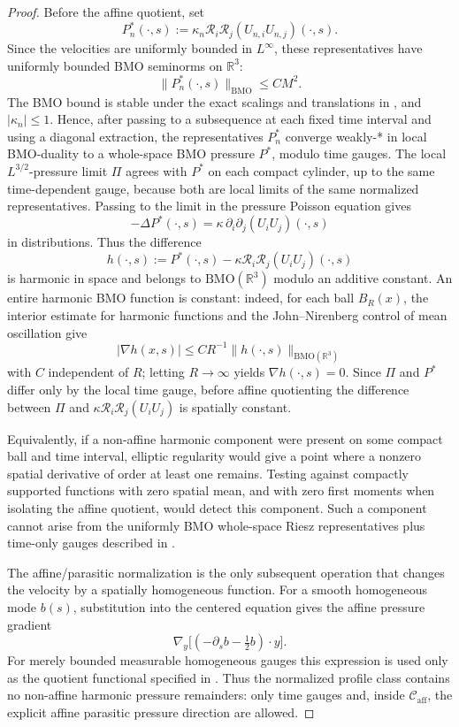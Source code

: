 \documentclass[11pt]{amsart}
\numberwithin{equation}{section}
\theoremstyle{plain}
\theoremstyle{definition}
\theoremstyle{remark}
\newcommand{\Caff}{\mathcal C_{\mathrm{aff}}}
\begin{document}
\begin{proof}
Before the affine quotient, set
\[
   P_n^\ast(\cdot,s):=\kappa_n\mathcal R_i\mathcal R_j(U_{n,i}U_{n,j})(\cdot,s).
\]
Since the velocities are uniformly bounded in \(L^\infty\), these
representatives have uniformly bounded BMO seminorms on \(\mathbb R^3\):
\[
   \|P_n^\ast(\cdot,s)\|_{\mathrm{BMO}}
   \le C M^2 .
\]
The BMO bound is stable under the exact scalings and translations in
, and \(|\kappa_n|\le1\).  Hence,
after passing to a subsequence at each fixed time interval and using a diagonal
extraction, the representatives \(P_n^\ast\) converge weakly-* in local
BMO-duality to a whole-space BMO pressure \(P^\ast\), modulo time gauges.  The
local \(L^{3/2}\)-pressure limit \(\Pi\) agrees with \(P^\ast\) on each compact
cylinder, up to the same time-dependent gauge, because both are local limits of
the same normalized representatives.  Passing to the limit in the pressure
Poisson equation gives
\[
   -\Delta P^\ast(\cdot,s)
   =
   \kappa\,\partial_i\partial_j(U_iU_j)(\cdot,s)
\]
in distributions.  Thus the difference
\[
   h(\cdot,s):=P^\ast(\cdot,s)-\kappa\mathcal R_i\mathcal R_j(U_iU_j)(\cdot,s)
\]
is harmonic in space and belongs to \(\mathrm{BMO}(\mathbb R^3)\) modulo an
additive constant.  An entire harmonic BMO function is constant: indeed, for
each ball \(B_R(x)\), the interior estimate for harmonic functions and the
John--Nirenberg control of mean oscillation give
\[
   |\nabla h(x,s)|
   \le
   C R^{-1}\|h(\cdot,s)\|_{\mathrm{BMO}(\mathbb R^3)}
\]
with \(C\) independent of \(R\); letting \(R\to\infty\) yields
\(\nabla h(\cdot,s)=0\).  Since \(\Pi\) and \(P^\ast\) differ only by the local
time gauge, before affine quotienting the difference between \(\Pi\) and
\(\kappa\mathcal R_i\mathcal R_j(U_iU_j)\) is spatially constant.

Equivalently, if a non-affine harmonic component were present on some compact
ball and time interval, elliptic regularity would give a point where a
nonzero spatial derivative of order at least one remains.  Testing against
compactly supported functions with zero spatial mean, and with zero first
moments when isolating the affine quotient, would detect this component.  Such
a component cannot arise from the uniformly BMO whole-space Riesz
representatives plus time-only gauges described in
.

The affine/parasitic normalization is the only subsequent operation that
changes the velocity by a spatially homogeneous function.  For a smooth
homogeneous mode \(b(s)\), substitution into the centered equation gives the
affine pressure gradient
\[
   \nabla_y\bigl[(-\partial_s b-\tfrac12 b)\cdot y\bigr].
\]
For merely bounded measurable homogeneous gauges this expression is used only
as the quotient functional specified in
.
Thus the normalized profile class contains no non-affine harmonic pressure
remainders: only time gauges and, inside \(\Caff\), the explicit affine
parasitic pressure direction are allowed.
\end{proof}
\end{document}
